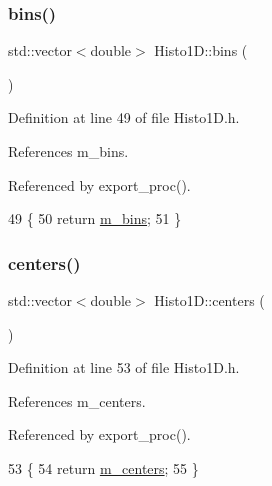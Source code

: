 \subsubsection{\texorpdfstring{bins()}{bins()}}
{\footnotesize\ttfamily std\+::vector$<$double$>$ Histo1\+D\+::bins (\begin{DoxyParamCaption}{ }\end{DoxyParamCaption})\hspace{0.3cm}{\ttfamily [inline]}}



Definition at line 49 of file Histo1\+D.\+h.



References m\+\_\+bins.



Referenced by export\+\_\+proc().


\begin{DoxyCode}
49                           \{  
50     \textcolor{keywordflow}{return} \hyperlink{classHisto1D_a7a82923d3938739904469f5aa0a517ca}{m\_bins};
51   \}
\end{DoxyCode}
\mbox{\label{classHisto1D_a07fd41679a3255cdd44d4dcf8865adb7}} 
\subsubsection{\texorpdfstring{centers()}{centers()}}
{\footnotesize\ttfamily std\+::vector$<$double$>$ Histo1\+D\+::centers (\begin{DoxyParamCaption}{ }\end{DoxyParamCaption})\hspace{0.3cm}{\ttfamily [inline]}}



Definition at line 53 of file Histo1\+D.\+h.



References m\+\_\+centers.



Referenced by export\+\_\+proc().


\begin{DoxyCode}
53                              \{  
54     \textcolor{keywordflow}{return} \hyperlink{classHisto1D_a0e03676ed176aaad2f615fa84b8ffcd3}{m\_centers};
55   \}
\end{DoxyCode}
\mbox{\label{classObject_aac010553f022165573714b7014a15f0d}} 
